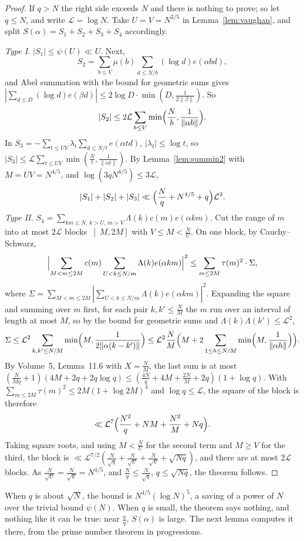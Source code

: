 \begin{proof}
If $q>N$ the right side exceeds $N$ and there is nothing to prove; so let $q\le N$, and write $\mathcal L=\log N$. Take $U=V=N^{2/5}$ in Lemma~\ref{lem:vaughan}, and split $S(\alpha)=S_1+S_2+S_3+S_4$ accordingly.

\emph{Type I.} $|S_1|\le\psi(U)\ll U$. Next,
\[
S_2=\sum_{b\le V}\mu(b)\sum_{d\le N/b}(\log d)e(\alpha bd),
\]
and Abel summation with the bound for geometric sums gives $|\sum_{d\le D}(\log d)e(\beta d)|\le2\log D\cdot\min(D,\frac1{2\|\beta\|})$. So
\[
|S_2|\le2\mathcal L\sum_{b\le V}\min\Bigl(\frac Nb,\frac1{\|\alpha b\|}\Bigr).
\]
In $S_3=-\sum_{t\le UV}\lambda_t\sum_{d\le N/t}e(\alpha td)$, $|\lambda_t|\le\log t$, so $|S_3|\le\mathcal L\sum_{t\le UV}\min(\frac Nt,\frac1{\|\alpha t\|})$. By Lemma~\ref{lem:summin2} with $M=UV=N^{4/5}$, and $\log(3qN^{4/5})\le3\mathcal L$,
\[
|S_1|+|S_2|+|S_3|\ll\Bigl(\frac Nq+N^{4/5}+q\Bigr)\mathcal L^2.
\]
\emph{Type II.} $S_4=\sum_{km\le N,\,k>U,\,m>V}\Lambda(k)c(m)e(\alpha km)$. Cut the range of $m$ into at most $2\mathcal L$ blocks $\left]M,2M\right]$ with $V\le M<\frac NU$. On one block, by Cauchy--Schwarz,
\[
\Bigl|\sum_{M<m\le2M}c(m)\sum_{U<k\le N/m}\Lambda(k)e(\alpha km)\Bigr|^2\le\sum_{m\le2M}\tau(m)^2\cdot\Sigma,
\]
where $\Sigma=\sum_{M<m\le2M}|\sum_{U<k\le N/m}\Lambda(k)e(\alpha km)|^2$. Expanding the square and summing over $m$ first, for each pair $k,k'\le\frac NM$ the $m$ run over an interval of length at most $M$, so by the bound for geometric sums and $\Lambda(k)\Lambda(k')\le\mathcal L^2$,
\[
\Sigma\le\mathcal L^2\sum_{k,k'\le N/M}\min\Bigl(M,\frac1{2\|\alpha(k-k')\|}\Bigr)\le\mathcal L^2\frac NM\Bigl(M+2\sum_{1\le h\le N/M}\min\Bigl(M,\frac1{\|\alpha h\|}\Bigr)\Bigr).
\]
By Volume~5, Lemma~11.6 with $X=\frac NM$, the last sum is at most $(\frac N{Mq}+1)(4M+2q+2q\log q)\le(\frac{4N}q+4M+\frac{2N}M+2q)(1+\log q)$. With $\sum_{m\le2M}\tau(m)^2\le2M(1+\log2M)^4$ and $\log q\le\mathcal L$, the square of the block is therefore
\[
\ll\mathcal L^7\Bigl(\frac{N^2}q+NM+\frac{N^2}M+Nq\Bigr).
\]
Taking square roots, and using $M<\frac NU$ for the second term and $M\ge V$ for the third, the block is $\ll\mathcal L^{7/2}(\frac N{\sqrt q}+\frac N{\sqrt U}+\frac N{\sqrt V}+\sqrt{Nq})$, and there are at most $2\mathcal L$ blocks. As $\frac N{\sqrt U}=\frac N{\sqrt V}=N^{4/5}$, and $\frac Nq\le\frac N{\sqrt q}$, $q\le\sqrt{Nq}$, the theorem follows.
\end{proof}

When $q$ is about $\sqrt N$, the bound is $N^{4/5}(\log N)^5$, a saving of a power of $N$ over the trivial bound $\psi(N)$. When $q$ is small, the theorem says nothing, and nothing like it can be true: near $\frac aq$, $S(\alpha)$ is large. The next lemma computes it there, from the prime number theorem in progressions.

